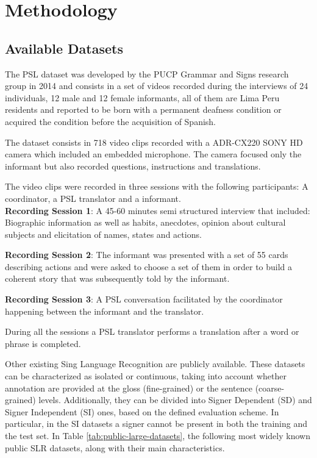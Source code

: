\chapter{Methodology} \label{chap-2}

\section{Available Datasets}\label{available-datasets}
The PSL dataset was developed by the PUCP Grammar and Signs research group in 2014 and consists in a set of videos recorded during the interviews of 24 individuals, 12 male and 12 female informants, all of them are Lima Peru residents and reported to be born with a permanent deafness condition or acquired the condition before the acquisition of Spanish. 

The dataset consists in 718 video clips recorded with a ADR-CX220 SONY HD camera which included an embedded microphone. The camera focused only the informant but also recorded questions, instructions and translations.

The video clips were recorded in three sessions with the following participants: A coordinator, a PSL \cite{lsp_2015} translator and a informant.\\

\textbf{Recording Session 1}: A 45-60 minutes semi structured interview that included: Biographic information as well as habits, anecdotes, opinion about cultural subjects and elicitation of names, states and actions. 

\textbf{Recording Session 2}: The informant was presented with a set of 55 cards describing actions and were asked to choose a set of them in order to build a coherent story that was subsequently told by the informant.

\textbf{Recording Session 3}: A PSL \cite{lsp_2015} conversation facilitated by the coordinator happening between the informant and the translator.

During all the sessions a PSL \cite{lsp_2015} translator performs a translation after a word or phrase is completed.

Other existing Sing Language Recognition are publicly available. These datasets can be characterized as isolated or continuous, taking into account whether annotation are provided at the gloss (fine-grained) or the sentence (coarse-grained) levels. Additionally, they can be divided into Signer Dependent (SD) and Signer Independent (SI) ones, based on the defined evaluation scheme. In particular, in the SI datasets a signer cannot be present in both the training and the test set. In Table \ref{tab:public-large-datasets}, the following most widely known public SLR datasets, along with their main characteristics.
